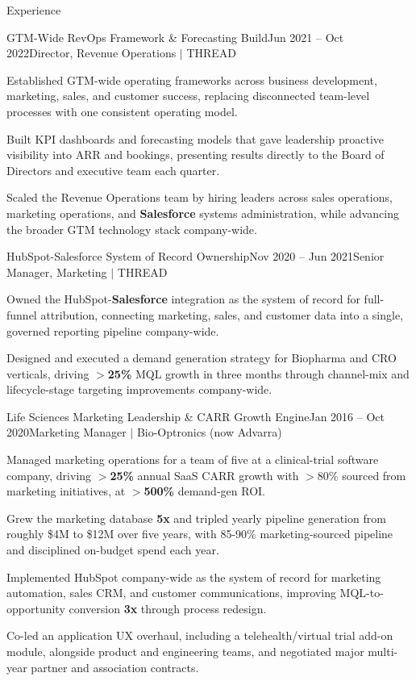 \documentclass{resume}
\begin{document}
\begin{rSection}{Experience}
\begin{rSubsection}{GTM-Wide RevOps Framework \& Forecasting Build}{\textcolor{black!60}{Jun 2021 -- Oct 2022}}{Director, Revenue Operations $\vert$ THREAD}{}
\item Established GTM-wide operating frameworks across business development, marketing, sales, and customer success, replacing disconnected team-level processes with one consistent operating model.
\item Built KPI dashboards and forecasting models that gave leadership proactive visibility into ARR and bookings, presenting results directly to the Board of Directors and executive team each quarter.
\item Scaled the Revenue Operations team by hiring leaders across sales operations, marketing operations, and \textbf{Salesforce} systems administration, while advancing the broader GTM technology stack company-wide.
\end{rSubsection}

\begin{rSubsection}{HubSpot-Salesforce System of Record Ownership}{\textcolor{black!60}{Nov 2020 -- Jun 2021}}{Senior Manager, Marketing $\vert$ THREAD}{}
\item Owned the HubSpot-\textbf{Salesforce} integration as the system of record for full-funnel attribution, connecting marketing, sales, and customer data into a single, governed reporting pipeline company-wide.
\item Designed and executed a demand generation strategy for Biopharma and CRO verticals, driving $>$\textbf{25\%} MQL growth in three months through channel-mix and lifecycle-stage targeting improvements company-wide.
\end{rSubsection}

\begin{rSubsection}{Life Sciences Marketing Leadership \& CARR Growth Engine}{\textcolor{black!60}{Jan 2016 -- Oct 2020}}{Marketing Manager $\vert$ Bio-Optronics (now Advarra)}{}
\item Managed marketing operations for a team of five at a clinical-trial software company, driving $>$\textbf{25\%} annual SaaS CARR growth with $>$80\% sourced from marketing initiatives, at $>$\textbf{500\%} demand-gen ROI.
\item Grew the marketing database \textbf{5x} and tripled yearly pipeline generation from roughly \$4M to \$12M over five years, with 85-90\% marketing-sourced pipeline and disciplined on-budget spend each year.
\item Implemented HubSpot company-wide as the system of record for marketing automation, sales CRM, and customer communications, improving MQL-to-opportunity conversion \textbf{3x} through process redesign.
\item Co-led an application UX overhaul, including a telehealth/virtual trial add-on module, alongside product and engineering teams, and negotiated major multi-year partner and association contracts.
\end{rSubsection}


\end{rSection}
\end{document}
